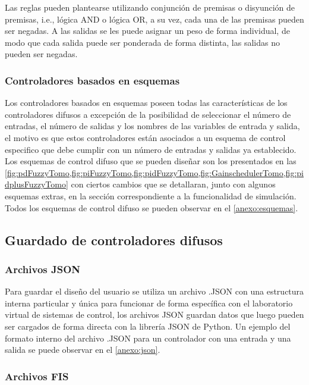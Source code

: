                 Las reglas pueden plantearse utilizando conjunción de premisas o disyunción de premisas, i.e., lógica AND o lógica OR, a su vez, cada una de las premisas pueden ser negadas. A las salidas se les puede asignar un peso de forma individual, de modo que cada salida puede ser ponderada de forma distinta, las salidas no pueden ser negadas.

        \subsubsection{Controladores basados en esquemas}

            Los controladores basados en esquemas poseen todas las características de los controladores difusos a excepción de la posibilidad de seleccionar el número de entradas, el número de salidas y los nombres de las variables de entrada y salida, el motivo es que estos controladores están asociados a un esquema de control especifico que debe cumplir con un número de entradas y salidas ya establecido. Los esquemas de control difuso que se pueden diseñar son los presentados en las \cref{fig:pdFuzzyTomo,fig:piFuzzyTomo,fig:pidFuzzyTomo,fig:GainschedulerTomo,fig:pidplusFuzzyTomo} con ciertos cambios que se detallaran, junto con algunos esquemas extras, en la sección correspondiente a la funcionalidad de simulación. Todos los esquemas de control difuso se pueden observar en el \ref{anexo:esquemas}.    

    \subsection{Guardado de controladores difusos}

        \subsubsection{Archivos JSON}
        
            Para guardar el diseño del usuario se utiliza un archivo .JSON con una estructura interna particular y única para funcionar de forma específica con el laboratorio virtual de sistemas de control, los archivos JSON guardan datos que luego pueden ser cargados de forma directa con la librería JSON de Python. Un ejemplo del formato interno del archivo .JSON para un controlador con una entrada y una salida se puede observar en el \ref{anexo:json}.

        \subsubsection{Archivos FIS}


